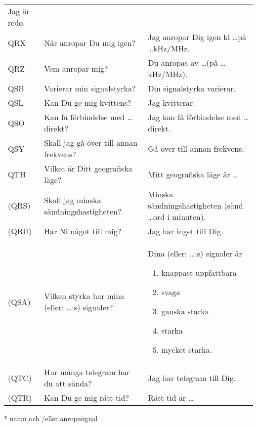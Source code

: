 \begin{table}
\begin{tabular}{lp{6cm}p{6cm}}
    Jag är redo.
    \\
    QRX
    &
    När anropar Du mig igen?
    &
    Jag anropar Dig igen kl \dots på \dots kHz/MHz.
    \\
    QRZ
    &
    Vem anropar mig?
    &
    Du anropas av \dots * (på \dots kHz/MHz).
    \\
    QSB
    &
    Varierar min signalstyrka?
    &
    Din signalstyrka varierar.
    \\
    QSL
    &
    Kan Du ge mig kvittens?
    &
    Jag kvitterar.
    \\
    QSO
    &
    Kan få förbindelse med \dots * direkt?
    &
    Jag kan få förbindelse med \dots * direkt.
    \\
    QSY
    &
    Skall jag gå över till annan frekvens?
    &
    Gå över till annan frekvens.
    \\
    QTH
    &
    Vilket är Ditt geografiska läge?
    &
    Mitt geografiska läge är \dots
    \\
    (QRS)
    &
    Skall jag minska sändningshastigheten?
    &
    Minska sändningshastigheten
    (sänd \dots ord i minuten).
    \\
    (QRU)
    &
    Har Ni något till mig?
    &
    Jag har inget till Dig.
    \\
    (QSA)
    &
    Vilken styrka har mina
    (eller: \dots *:s) signaler?
    &
    Dina (eller: \dots *:s) signaler är
    \vspace{-\topsep}
    \begin{enumerate}[noitemsep]
    	\item knappast uppfattbara
    	\item svaga
    	\item ganska starka
    	\item starka
    	\item mycket starka.
    \end{enumerate}
    \\
    (QTC)
    &
    Hur många telegram har du att sända?
    &
    Jag har telegram till Dig.
    \\
    (QTR)
    &
    Kan Du ge mig rätt tid?
    &
    Rätt tid är \dots
    \\
  \end{tabular}
* namn och /eller anropssignal
\end{table}

